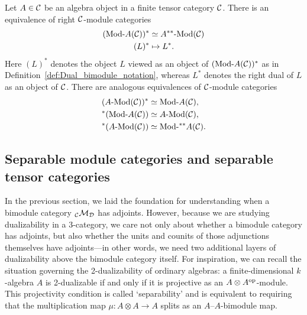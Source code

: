 \documentclass{amsart}
\begin{document}
\begin{corollary} \label{cor:dualamod}
Let $A \in \mathcal C$ be an algebra object in a finite tensor category $\mathcal C$.  There is an equivalence of right $\mathcal C$-module categories
	\begin{align*}
		(\Mod{}{A}(\cC))^* & \simeq \Mod{A^{**}}{}(\cC) \\
		(L)^* & \mapsto L^*.
	\end{align*}
Here $(L)^*$ denotes the object $L$ viewed as an object of $(\Mod{}{A}(\cC))^*$ as in Definition~\ref{def:Dual_bimodule_notation}, whereas $L^*$ denotes the right dual of $L$ as an object of $\mathcal C$.  There are analogous equivalences of $\mathcal C$-module categories
\begin{align*}
(\Mod{A}{}(\cC))^* &\simeq \Mod{}{A}(\cC), \\
{}^*(\Mod{}{A}(\cC)) &\simeq \Mod{A}{}(\cC), \\
{}^*(\Mod{A}{}(\cC)) &\simeq \Mod{}{{}^{**}A}(\cC).
\end{align*}
\end{corollary}

\subsection{Separable module categories and separable tensor categories} \label{sec:tc-separable}

In the previous section, we laid the foundation for understanding when a bimodule category ${}_\mathcal C \mathcal M_\mathcal D$ has adjoints.  However, because we are studying dualizability in a 3-category, we care not only about whether a bimodule category has adjoints, but also whether the units and counits of those adjunctions themselves have adjoints---in other words, we need two additional layers of dualizability above the bimodule category itself.  For inspiration, we can recall the situation governing the 2-dualizability of ordinary algebras: a finite-dimensional $k$-algebra $A$ is 2-dualizable if and only if it is projective as an $A \otimes A^{\mathrm{op}}$-module.  This projectivity condition is called `separability' and is equivalent to requiring that the multiplication map $\mu: A \otimes A \rightarrow A$ splits as an $A$--$A$-bimodule map.  
\end{document}
